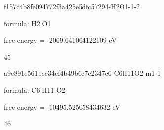 \documentclass{article}
\begin{document}
\vspace{1cm}


f157c4b8fe094772f3a425e5dfc57294-H2O1-1-2



formula: H2 O1



free energy = -2069.641064122109 eV

45

\vspace{1cm}


a9e891e561bce34cf4b49b6c7c2347c6-C6H11O2-m1-1



formula: C6 H11 O2



free energy = -10495.525058434632 eV

46
\end{document}
